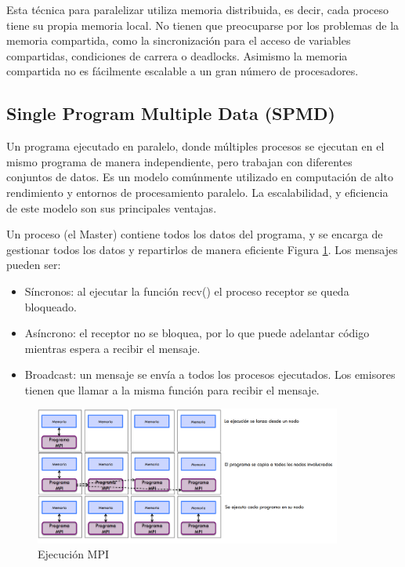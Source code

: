	\newpage

	Esta técnica para paralelizar utiliza memoria distribuida, es decir, cada proceso tiene su propia memoria local. No tienen que preocuparse por los problemas de la memoria compartida, como la sincronización para el acceso de variables compartidas, condiciones de carrera o deadlocks. Asimismo la memoria compartida no es fácilmente escalable a un gran número de procesadores\cite{jjruiz2016compartida}.


	\subsection{Single Program Multiple Data (SPMD)}
	Un programa ejecutado en paralelo, donde múltiples procesos se ejecutan en el mismo programa de manera independiente, pero trabajan con diferentes conjuntos de datos. Es un modelo comúnmente utilizado en computación de alto rendimiento y entornos de procesamiento paralelo. La escalabilidad, y eficiencia de este modelo son sus principales ventajas.

	Un proceso (el Master) contiene todos los datos del programa, y se encarga de gestionar todos los datos y repartirlos de manera eficiente Figura \ref{fig:ejecucion_mpi}. Los mensajes pueden ser:

	\begin{itemize}
		\item Síncronos: al ejecutar la función recv() el proceso receptor se queda bloqueado.
		\item Asíncrono: el receptor no se bloquea, por lo que puede adelantar código mientras espera a recibir el mensaje.
		\item Broadcast: un mensaje se envía a todos los procesos ejecutados. Los emisores tienen que llamar a la misma función para recibir el mensaje.
	\end{itemize}


	\vspace{-0.2cm}

	\begin{figure}[!h]
		\centering
		\includegraphics[width=0.9\textwidth]{images/chapter_2/mpi_2}
		\caption{Ejecución MPI}
		\label{fig:ejecucion_mpi}
	\end{figure}

